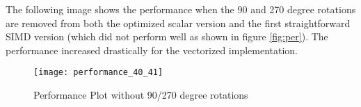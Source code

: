 The following image shows the performance when the 90 and 270 degree rotations
are removed from both the optimized scalar version and the first straightforward
SIMD version (which did not perform well as shown in figure \ref{fig:per}). The
performance increased drastically for the vectorized implementation.

\begin{figure}[!ht]
  \centering
  \texttt{[image: performance\_40\_41]}
  \caption{Performance Plot without 90/270 degree rotations}
  \label{fig:perf_40_41}
\end{figure}









